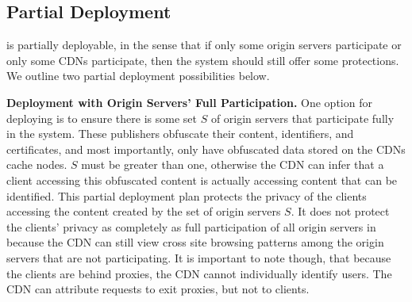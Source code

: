 
\subsection{Partial Deployment}
\label{sec:partial}
\system{} is partially deployable, in the sense that if only some origin servers participate or only some CDNs participate, then 
the system should still offer some protections.  We outline two partial
deployment possibilities below.

\textbf{Deployment with Origin Servers' Full Participation.}
One option for deploying \system{} is to ensure there is some set $S$ of origin servers that participate fully in the 
system.  These publishers obfuscate their content, identifiers, and certificates, and most importantly, only have 
obfuscated data stored on the CDNs cache nodes.  $S$ must be greater than one, otherwise the CDN can infer 
that a client accessing this obfuscated content is actually accessing content that can be identified.  This partial deployment plan 
 protects the privacy of the clients accessing the content created by the set of origin servers $S$.  It does not 
protect the clients' privacy as completely as full participation of all origin servers in \system{} because the CDN can 
still view cross site browsing patterns among the origin servers that are not participating. It is important to note though, that 
because the clients are behind proxies, the CDN cannot individually identify users.  The CDN can attribute requests to exit proxies, but 
not to clients.  

